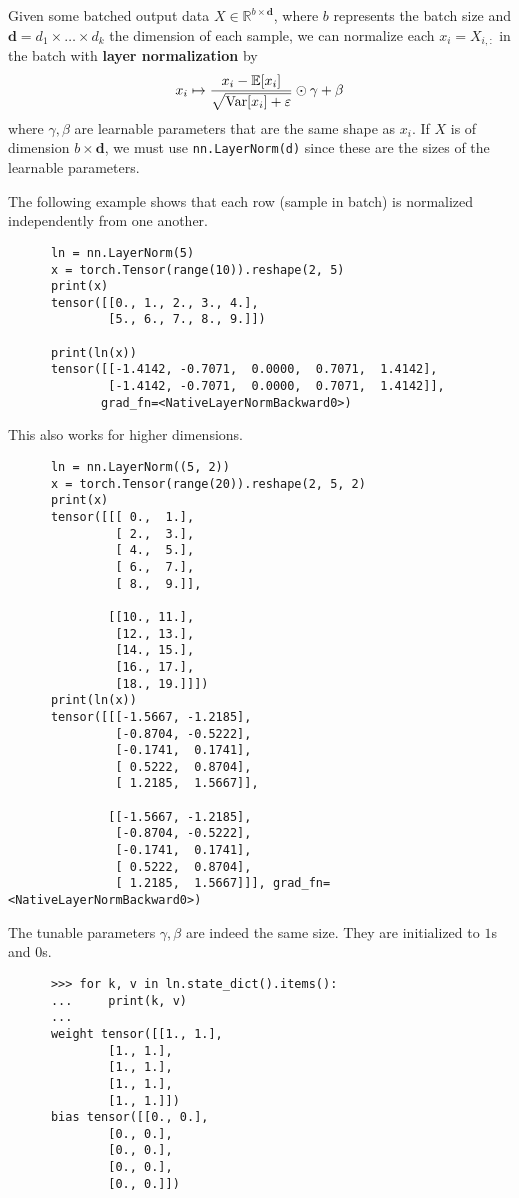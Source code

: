   \begin{definition}
    Given some batched output data $X \in \mathbb{R}^{b \times \mathbf{d}}$, where $b$ represents the batch size and $\mathbf{d} = d_1 \times \ldots \times d_k$ the dimension of each sample, we can normalize each $x_i = X_{i, :}$ in the batch with \textbf{layer normalization} by 
    \begin{equation}
      x_i \mapsto \frac{x_i - \mathbb{E}[x_i]}{\sqrt{\Var[x_i] + \varepsilon}} \odot \gamma + \beta
    \end{equation}
    where $\gamma, \beta$ are learnable parameters that are the same shape as $x_i$. If $X$ is of dimension $b \times \mathbf{d}$, we must use \texttt{nn.LayerNorm(d)} since these are the sizes of the learnable parameters. 
  \end{definition}

  \begin{example}
    The following example shows that each row (sample in batch) is normalized independently from one another. 
    \begin{lstlisting}
      ln = nn.LayerNorm(5)
      x = torch.Tensor(range(10)).reshape(2, 5)
      print(x)
      tensor([[0., 1., 2., 3., 4.],
              [5., 6., 7., 8., 9.]])

      print(ln(x))
      tensor([[-1.4142, -0.7071,  0.0000,  0.7071,  1.4142],
              [-1.4142, -0.7071,  0.0000,  0.7071,  1.4142]],
             grad_fn=<NativeLayerNormBackward0>)
    \end{lstlisting}
    This also works for higher dimensions. 
    \begin{lstlisting}
      ln = nn.LayerNorm((5, 2))
      x = torch.Tensor(range(20)).reshape(2, 5, 2)
      print(x)
      tensor([[[ 0.,  1.],
               [ 2.,  3.],
               [ 4.,  5.],
               [ 6.,  7.],
               [ 8.,  9.]],

              [[10., 11.],
               [12., 13.],
               [14., 15.],
               [16., 17.],
               [18., 19.]]])
      print(ln(x))
      tensor([[[-1.5667, -1.2185],
               [-0.8704, -0.5222],
               [-0.1741,  0.1741],
               [ 0.5222,  0.8704],
               [ 1.2185,  1.5667]],

              [[-1.5667, -1.2185],
               [-0.8704, -0.5222],
               [-0.1741,  0.1741],
               [ 0.5222,  0.8704],
               [ 1.2185,  1.5667]]], grad_fn=<NativeLayerNormBackward0>)
    \end{lstlisting}
    The tunable parameters $\gamma, \beta$ are indeed the same size. They are initialized to $1$s and $0$s. 
      \begin{lstlisting}
      >>> for k, v in ln.state_dict().items(): 
      ...     print(k, v)
      ... 
      weight tensor([[1., 1.],
              [1., 1.],
              [1., 1.],
              [1., 1.],
              [1., 1.]])
      bias tensor([[0., 0.],
              [0., 0.],
              [0., 0.],
              [0., 0.],
              [0., 0.]])
    \end{lstlisting}
  \end{example}

